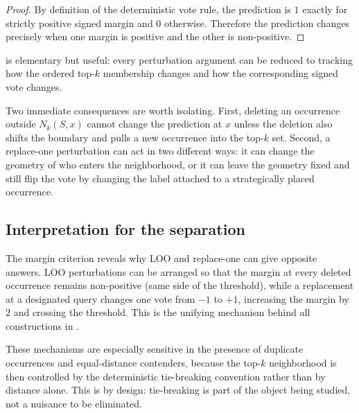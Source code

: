 \begin{proof}
By definition of the deterministic vote rule, the prediction is $1$ exactly for
strictly positive signed margin and $0$ otherwise.  Therefore the prediction
changes precisely when one margin is positive and the other is non-positive.
\end{proof}

 is elementary but useful: every perturbation argument can be
reduced to tracking how the ordered top-$k$ membership changes and how the
corresponding signed vote changes.

Two immediate consequences are worth isolating.  First, deleting an occurrence
outside $N_k(S,x)$ cannot change the prediction at $x$ unless the deletion also
shifts the boundary and pulls a new occurrence into the top-$k$ set.  Second, a
replace-one perturbation can act in two different ways: it can change the
geometry of who enters the neighborhood, or it can leave the geometry fixed and
still flip the vote by changing the label attached to a strategically placed
occurrence.

\subsection{Interpretation for the separation}

The margin criterion reveals why LOO and replace-one can give opposite answers.
LOO perturbations can be arranged so that the margin at every deleted
occurrence remains non-positive (same side of the threshold), while a
replacement at a designated query changes one vote from $-1$ to $+1$,
increasing the margin by $2$ and crossing the threshold.  This is the unifying
mechanism behind all constructions in .

These mechanisms are especially sensitive in the presence of duplicate
occurrences and equal-distance contenders, because the top-$k$ neighborhood is
then controlled by the deterministic tie-breaking convention rather than by
distance alone.  This is by design: tie-breaking is part of the object being
studied, not a nuisance to be eliminated.
